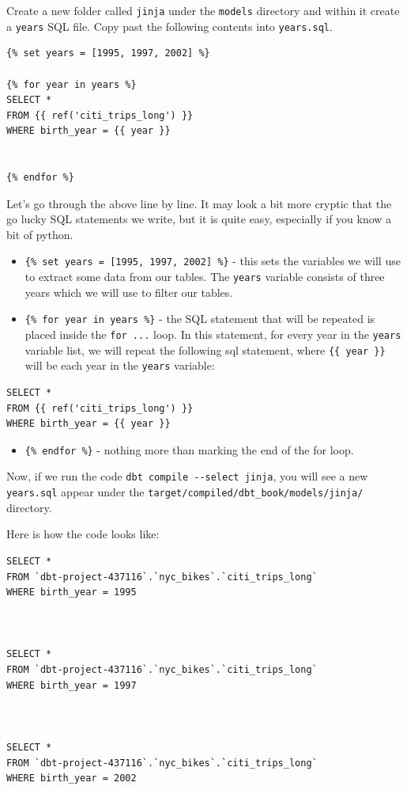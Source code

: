 \documentclass[
]{book}
\providecommand{\tightlist}{%
  \setlength{\itemsep}{0pt}\setlength{\parskip}{0pt}}
\begin{document}
Create a new folder called \texttt{jinja} under the \texttt{models} directory and within it create a \texttt{years} SQL file. Copy past the following contents into \texttt{years.sql}.

\begin{verbatim}
{% set years = [1995, 1997, 2002] %}

{% for year in years %}
SELECT * 
FROM {{ ref('citi_trips_long') }}
WHERE birth_year = {{ year }}


{% endfor %}
\end{verbatim}

Let's go through the above line by line. It may look a bit more cryptic that the go lucky SQL statements we write, but it is quite easy, especially if you know a bit of python.

\begin{itemize}
\item
  \texttt{\{\%\ set\ years\ =\ {[}1995,\ 1997,\ 2002{]}\ \%\}} - this sets the variables we will use to extract some data from our tables. The \texttt{years} variable consists of three years which we will use to filter our tables.
\item
  \texttt{\{\%\ for\ year\ in\ years\ \%\}} - the SQL statement that will be repeated is placed inside the \texttt{for\ ...} loop. In this statement, for every year in the \texttt{years} variable list, we will repeat the following sql statement, where \texttt{\{\{\ year\ \}\}} will be each year in the \texttt{years} variable:
\end{itemize}

\begin{verbatim}
SELECT * 
FROM {{ ref('citi_trips_long') }}
WHERE birth_year = {{ year }}
\end{verbatim}

\begin{itemize}
\tightlist
\item
  \texttt{\{\%\ endfor\ \%\}} - nothing more than marking the end of the for loop.
\end{itemize}

Now, if we run the code \texttt{dbt\ compile\ -\/-select\ jinja}, you will see a new \texttt{years.sql} appear under the \texttt{target/compiled/dbt\_book/models/jinja/} directory.

Here is how the code looks like:

\begin{verbatim}
SELECT * 
FROM `dbt-project-437116`.`nyc_bikes`.`citi_trips_long`
WHERE birth_year = 1995



SELECT * 
FROM `dbt-project-437116`.`nyc_bikes`.`citi_trips_long`
WHERE birth_year = 1997



SELECT * 
FROM `dbt-project-437116`.`nyc_bikes`.`citi_trips_long`
WHERE birth_year = 2002
\end{verbatim}
\end{document}
